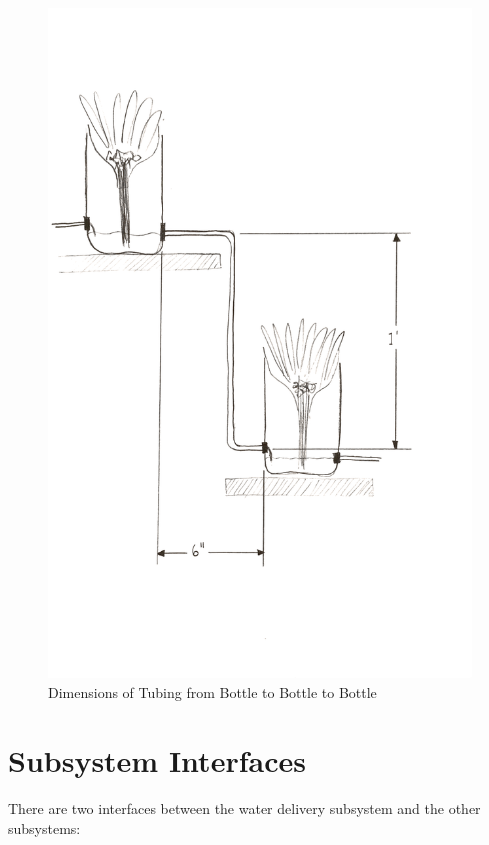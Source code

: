 \documentclass[12pt]{article}
\begin{document}
\pagebreak
\begin{figure}[H]
    \centering
    \includegraphics[width=135mm]{resources/tubing-bottle-to-bottle.png}
    \caption{Dimensions of Tubing from Bottle to Bottle to Bottle}
\end{figure}

\section{Subsystem Interfaces}

There are two interfaces between the water delivery subsystem and the other subsystems:
\end{document}
